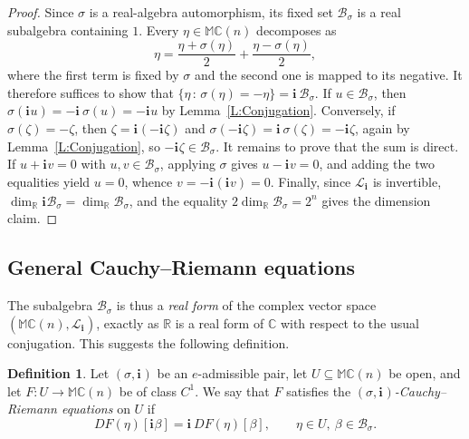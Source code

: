 \documentclass[12pt]{amsart}
\theoremstyle{plain}
\theoremstyle{definition}
\newtheorem{definition}[theorem]{Definition}
\numberwithin{equation}{section}
\newcommand{\im}[1]{\mathbf{ i_{#1}}}
\newcommand{\mC}{\mathbb{C}}
\newcommand{\mR}{\mathbb{R}}
\newcommand{\mM}{\mathbb{M}}
\newcommand{\cL}{\mathcal{L}}
\newcommand{\cB}{\mathcal{B}}
\newcommand{\ra}{\rightarrow}
\begin{document}
    \begin{proof}
    Since $\sigma$ is a real-algebra automorphism, its fixed set $\cB_\sigma$ is a real subalgebra containing $1$. Every $\eta \in \mM \mC(n)$ decomposes as
    \[
    \eta = \frac{\eta + \sigma (\eta)}{2} + \frac{\eta - \sigma (\eta )}{2},
    \]
    where the first term is fixed by $\sigma$ and the second one is mapped to its negative. It therefore suffices to show that $\{ \eta\, :\, \sigma (\eta ) = - \eta \} = \im{}\, \cB_\sigma$. If $u \in \cB_\sigma$, then $\sigma (\im{} u ) = -\im{}\, \sigma (u) = -\im{} u$ by Lemma~\ref{L:Conjugation}. Conversely, if $\sigma (\zeta ) = - \zeta$, then $\zeta = \im{} ( - \im{} \zeta )$ and $\sigma (- \im{} \zeta) = \im{}\, \sigma (\zeta ) = - \im{} \zeta$, again by Lemma~\ref{L:Conjugation}, so $-\im{} \zeta \in \cB_\sigma$. It remains to prove that the sum is direct. If $u + \im{} v = 0$ with $u , v \in \cB_\sigma$, applying $\sigma$ gives $u - \im{} v = 0$, and adding the two equalities yield $u = 0$, whence $v = - \im{} (\im{} v ) = 0$. Finally, since $\cL_{\im{}}$ is invertible, $\dim_{\mR} \im{} \cB_\sigma = \dim_{\mR} \cB_\sigma$, and the equality $2 \dim_{\mR} \cB_\sigma = 2^n$ gives the dimension claim.
    \end{proof}

\subsection{General Cauchy--Riemann equations}\label{SS:GeneralCR}
The subalgebra $\cB_\sigma$ is thus a \emph{real form} of the complex vector space $(\mM \mC(n) , \cL_{\im{}})$, exactly as $\mR$ is a real form of $\mC$ with respect to the usual conjugation. This suggests the following definition.

    \begin{definition}\label{D:SigmaCR}
    Let $(\sigma , \im{})$ be an $e$-admissible pair, let $U \subseteq \mM \mC(n)$ be open, and let $F : U \ra \mM \mC(n)$ be of class $C^1$. We say that $F$ satisfies the \emph{$(\sigma , \im{})$-Cauchy--Riemann equations} on $U$ if
        \begin{equation}\label{Eq:SigmaCR}
        D F (\eta ) [ \im{} \beta ] = \im{}\, DF (\eta ) [\beta] , \qquad \eta \in U , \ \beta \in \cB_\sigma.
        \end{equation}
    \end{definition}
\end{document}
